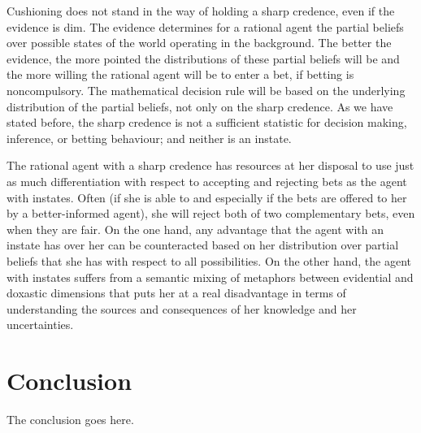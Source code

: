 \documentclass[journal]{IEEEtran}
\newcommand{\doxnotep}[0]{doxastic}
\begin{document}
Cushioning does not stand in the way of holding a sharp credence, even
if the evidence is dim. The evidence determines for a rational agent
the partial beliefs over possible states of the world operating in the
background. The better the evidence, the more pointed the
distributions of these partial beliefs will be and the more willing
the rational agent will be to enter a bet, if betting is
noncompulsory. The mathematical decision rule will be based on the
underlying distribution of the partial beliefs, not only on the sharp
credence. As we have stated before, the sharp credence is not a
sufficient statistic for decision making, inference, or betting
behaviour; and neither is an instate.

The rational agent with a sharp credence has resources at her disposal
to use just as much differentiation with respect to accepting and
rejecting bets as the agent with instates. Often (if she is able to
and especially if the bets are offered to her by a better-informed
agent), she will reject both of two complementary bets, even when they
are fair. On the one hand, any advantage that the agent with an
instate has over her can be counteracted based on her distribution
over partial beliefs that she has with respect to all possibilities.
On the other hand, the agent with instates suffers from a semantic
mixing of metaphors between evidential and {\doxnotep} dimensions that
puts her at a real disadvantage in terms of understanding the sources
and consequences of her knowledge and her uncertainties.

\section{Conclusion}
The conclusion goes here.


%
\end{document}
